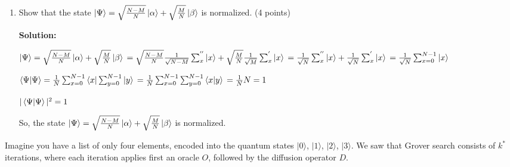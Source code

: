 \documentclass[12pt]{article}
\begin{document}
\begin{enumerate}[start=3]
    \item Show that the state $\ket{\Psi} = \sqrt{\frac{N-M}{N}}\ket{\alpha} + \sqrt{\frac{M}{N}}\ket{\beta}$ is normalized. (4 points)

          \textbf{Solution:}



          $\ket{\Psi} = \sqrt{\frac{N-M}{N}}\ket{\alpha} + \sqrt{\frac{M}{N}}\ket{\beta}
              \\=\sqrt{\frac{N-M}{N}}\frac{1}{\sqrt{N-M}}\sum_{x}^{''} \ket{x}+\sqrt{\frac{M}{N}}\frac{1}{\sqrt{M}}\sum_{x}^{'} \ket{x}
              \\=\frac{1}{\sqrt{N}}\sum_{x}^{''} \ket{x}+\frac{1}{\sqrt{N}}\sum_{x}^{'} \ket{x}
              \\=\frac{1}{\sqrt{N}}\sum_{x=0}^{N-1} \ket{x}
          $


          $\braket{\Psi|\Psi} = \frac{1}{N}\sum_{x=0}^{N-1} \bra{x}\sum_{y=0}^{N-1} \ket{y}
              \\=\frac{1}{N}\sum_{x=0}^{N-1} \sum_{y=0}^{N-1} \braket{x|y}
              \\=\frac{1}{N}N
              \\=1$






          $|\braket{\Psi|\Psi}|^2 = 1$


          So, the state $\ket{\Psi} = \sqrt{\frac{N-M}{N}}\ket{\alpha} + \sqrt{\frac{M}{N}}\ket{\beta}$ is normalized.

\end{enumerate}



Imagine you have a list of only four elements, encoded into the quantum states $|0\rangle$, $|1\rangle$, $|2\rangle$, $|3\rangle$. We saw that Grover search consists of $k^*$ iterations, where each iteration applies first an oracle $O$, followed by the diffusion operator $D$.
\end{document}
